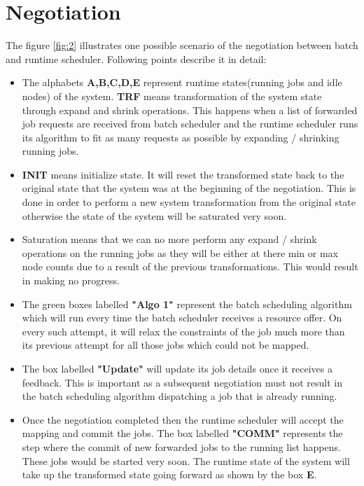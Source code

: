 \section{Negotiation}
The figure \ref{fig:2} illustrates one possible scenario of the negotiation between batch and runtime scheduler. Following points describe it in detail:
\begin{itemize}
\item The alphabets \textbf{A,B,C,D,E} represent runtime states(running jobs and idle nodes) of the system. \textbf{TRF} means transformation of the system state through expand and shrink operations. This happens when a list of forwarded job requests are received from batch scheduler and the runtime scheduler runs its algorithm to fit as many requests as possible by expanding / shrinking running jobs.
\item \textbf{INIT} means initialize state. It will reset the transformed state back to the original state that the system was at the beginning of the negotiation. This is done in order to perform a new system transformation from the original state otherwise the state of the system will be saturated very soon.
\item Saturation means that we can no more perform any expand / shrink operations on the running jobs as they will be either at there min or max node counts due to a result of the previous transformations. This would result in making no progress.
\item The green boxes labelled \textbf{"Algo 1"} represent the batch scheduling algorithm which will run every time the batch scheduler receives a resource offer. On every such attempt, it will relax the constraints of the job much more than its previous attempt for all those jobs which could not be mapped.
\item The box labelled \textbf{"Update"} will update its job details once it receives a feedback. This is important as a subsequent negotiation must not result in the batch scheduling algorithm dispatching a job that is already running.
\item Once the negotiation completed then the runtime scheduler will accept the mapping and commit the jobs. The box labelled \textbf{"COMM"} represents the step where the commit of new forwarded jobs to the running list happens. These jobs would be started very soon. The runtime state of the system will take up the transformed state going forward as shown by the box \textbf{E}.
\end{itemize}
